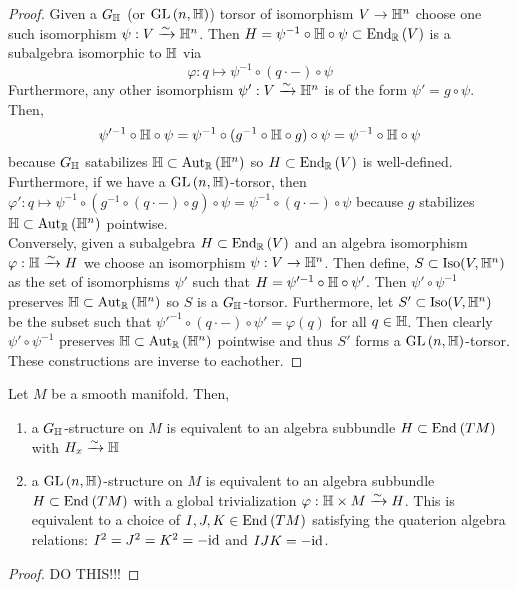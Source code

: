 \documentclass[12pt]{extarticle}
\newcommand{\R}{\mathbb{R}}
\begin{document}
\begin{proof}
Given a $G_{\mathbb{H}}$ (or $\mathrm{GL}\left(n, \mathbb{H} \right)$) torsor of isomorphism $V \to \mathbb{H}^n$ choose one such isomorphism $\psi : V \xrightarrow{\sim} \mathbb{H}^n$. Then $H = \psi^{-1} \circ \H \circ \psi \subset \End{\R}{V}$ is a subalgebra isomorphic to $\mathbb{H}$ via
\[ \varphi : q \mapsto \psi^{-1} \circ (q \cdot -) \circ \psi \]
Furthermore, any other isomorphism $\psi' : V \xrightarrow{\sim} \mathbb{H}^n$ is of the form $\psi' = g \circ \psi$. Then, 
\[ \psi'^{-1} \circ \mathbb{H} \circ \psi = \psi^{-1} \circ (g^{-1} \circ \mathbb{H} \circ g) \circ \psi = \psi^{-1} \circ \mathbb{H} \circ \psi \]
because $G_{\mathbb{H}}$ satabilizes $\H \subset \Aut{\R}{\H^n}$ so $H \subset \End{\R}{V}$ is well-defined. Furthermore, if we have a $\mathrm{GL}\left(n, \mathbb{H} \right)$-torsor, then $\varphi' : q \mapsto \psi^{-1} \circ (g^{-1} \circ (q \cdot -) \circ g) \circ \psi = \psi^{-1} \circ (q \cdot -) \circ \psi$ because $g$ stabilizes $\H \subset \Aut{\R}{\H^n}$ pointwise.
\bigskip\\
Conversely, given a subalgebra $H \subset \End{\R}{V}$ and an algebra isomorphism $\varphi : \mathbb{H} \xrightarrow{\sim} H$ we choose an isomorphism $\psi : V \to \mathbb{H}^n$. Then define, $S \subset \mathrm{Iso}(V, \mathbb{H}^n)$ as the set of isomorphisms $\psi'$ such that $H = \psi'^{-1} \circ \mathbb{H} \circ \psi'$. Then $\psi' \circ \psi^{-1}$ preserves $\H \subset \Aut{\R}{\H^n}$ so $S$ is a $G_{\mathbb{H}}$-torsor. Furthermore, let $S' \subset \mathrm{Iso}(V, \mathbb{H}^n)$ be the subset such that $\psi'^{-1} \circ (q \cdot -) \circ \psi' = \varphi(q)$ for all $q \in \mathbb{H}$. Then clearly $\psi' \circ \psi^{-1}$ preserves $\H \subset \Aut{\R}{\H^n}$ pointwise and thus $S'$ forms a $\mathrm{GL}\left(n, \mathbb{H} \right)$-torsor. These constructions are inverse to eachother.
\end{proof}

\begin{theorem}
Let $M$ be a smooth manifold. Then,
\begin{enumerate}
\item a $G_{\mathbb{H}}$-structure on $M$ is equivalent to an algebra subbundle $H \subset \mathrm{End}_{}\left(TM\right)$ with $H_x \xrightarrow{\sim} \mathbb{H}$
\item a $\mathrm{GL}\left(n,\mathbb{H} \right)$-structure on $M$ is equivalent to an algebra subbundle $H \subset \mathrm{End}_{}\left(TM\right)$ with a global trivialization $\varphi : \mathbb{H} \times M \xrightarrow{\sim} H$. This is equivalent to a choice of $I, J, K \in \mathrm{End}_{}\left(TM\right)$ satisfying the quaterion algebra relations: $I^2 = J^2 = K^2 = -\mathrm{id}$ and $IJK = -\mathrm{id}$.
\end{enumerate}
\end{theorem}

\begin{proof}
DO THIS!!!
\end{proof}
\end{document}
